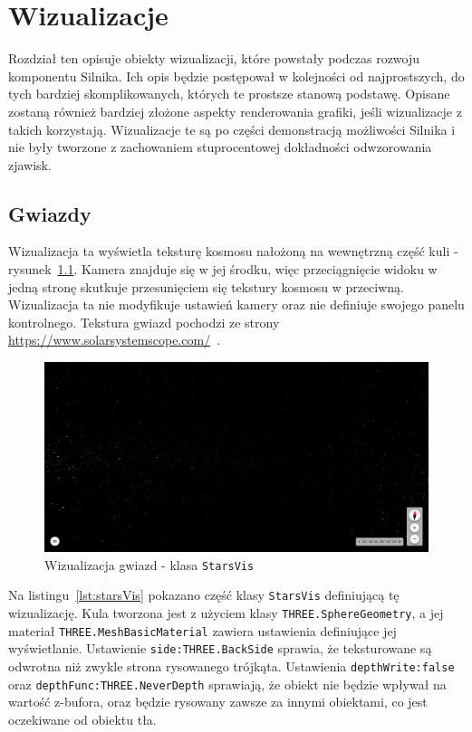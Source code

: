 \chapter{Wizualizacje}

Rozdział ten opisuje obiekty wizualizacji, które powstały podczas rozwoju komponentu Silnika. Ich opis będzie postępował w kolejności od najprostszych, do tych bardziej skomplikowanych, których te prostsze stanową podstawę. Opisane zostaną również bardziej złożone aspekty renderowania grafiki, jeśli wizualizacje z takich korzystają.
Wizualizacje te są po części demonstracją możliwości Silnika i nie były tworzone z zachowaniem stuprocentowej dokładności odwzorowania zjawisk.

\section{Gwiazdy}

Wizualizacja ta wyświetla teksturę kosmosu nałożoną na wewnętrzną część kuli - rysunek~\ref{fig:c4_starsVis}. Kamera znajduje się w jej środku, więc przeciągnięcie widoku w jedną stronę skutkuje przesunięciem się tekstury kosmosu w przeciwną. Wizualizacja ta nie modyfikuje ustawień kamery oraz nie definiuje swojego panelu kontrolnego. Tekstura gwiazd pochodzi ze strony \url{https://www.solarsystemscope.com/}~\cite{SolarTextures}. 

\begin{figure}[h]
    \centering
    \includegraphics[width=\linewidth]{img/c4_starsVis.png}
    \caption{Wizualizacja gwiazd - klasa \texttt{StarsVis}}
    \label{fig:c4_starsVis} 
\end{figure}

Na listingu~\ref{lst:starsVis} pokazano część klasy \texttt{StarsVis} definiującą tę wizualizację. Kula tworzona jest z użyciem klasy \texttt{THREE.SphereGeometry}, a jej materiał \texttt{THREE.MeshBasicMaterial} zawiera ustawienia definiujące jej wyświetlanie. Ustawienie \mbox{\texttt{side:THREE.BackSide}} sprawia, że teksturowane są odwrotna niż zwykle strona rysowanego trójkąta. Ustawienia \mbox{\texttt{depthWrite:false}} oraz \mbox{\texttt{depthFunc:THREE.NeverDepth}} sprawiają, że obiekt nie będzie wpływał na wartość z-bufora, oraz będzie rysowany zawsze za innymi obiektami, co jest oczekiwane od obiektu tła. 


